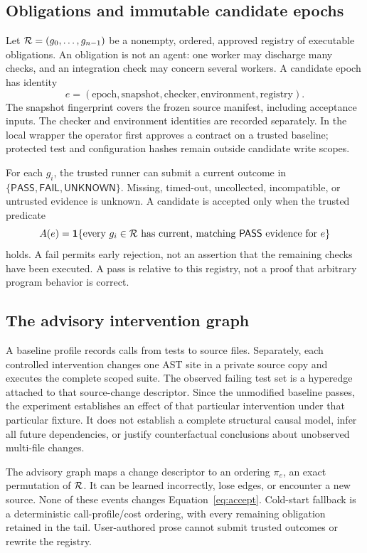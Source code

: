 \documentclass[11pt]{article}
\theoremstyle{definition}\newtheorem{definition}[theorem]{Definition}
\theoremstyle{remark}\newtheorem{remark}[theorem]{Remark}
\newcommand{\PASS}{\mathsf{PASS}}\newcommand{\FAIL}{\mathsf{FAIL}}\newcommand{\UNKNOWN}{\mathsf{UNKNOWN}}
\begin{document}
\subsection{Obligations and immutable candidate epochs}
Let $\mathcal R=(g_0,\ldots,g_{n-1})$ be a nonempty, ordered, approved registry of executable obligations. An obligation is not an agent: one worker may discharge many checks, and an integration check may concern several workers. A candidate epoch has identity
\begin{equation}
 e=(\mathrm{epoch},\mathrm{snapshot},\mathrm{checker},\mathrm{environment},\mathrm{registry}).
\end{equation}
The snapshot fingerprint covers the frozen source manifest, including acceptance inputs. The checker and environment identities are recorded separately. In the local wrapper the operator first approves a contract on a trusted baseline; protected test and configuration hashes remain outside candidate write scopes.

For each $g_i$, the trusted runner can submit a current outcome in $\{\PASS,\FAIL,\UNKNOWN\}$. Missing, timed-out, uncollected, incompatible, or untrusted evidence is unknown. A candidate is accepted only when the trusted predicate
\begin{equation}\label{eq:accept}
 A(e)=\ind\{\text{every }g_i\in\R\text{ has current, matching }\PASS\text{ evidence for }e\}
\end{equation}
holds. A fail permits early rejection, not an assertion that the remaining checks have been executed. A pass is relative to this registry, not a proof that arbitrary program behavior is correct.

\subsection{The advisory intervention graph}
A baseline profile records calls from tests to source files. Separately, each controlled intervention changes one AST site in a private source copy and executes the complete scoped suite. The observed failing test set is a hyperedge attached to that source-change descriptor. Since the unmodified baseline passes, the experiment establishes an effect of that particular intervention under that particular fixture. It does not establish a complete structural causal model, infer all future dependencies, or justify counterfactual conclusions about unobserved multi-file changes.

The advisory graph maps a change descriptor to an ordering $\pi_e$, an exact permutation of $\mathcal R$. It can be learned incorrectly, lose edges, or encounter a new source. None of these events changes Equation~\eqref{eq:accept}. Cold-start fallback is a deterministic call-profile/cost ordering, with every remaining obligation retained in the tail. User-authored prose cannot submit trusted outcomes or rewrite the registry.
\end{document}
